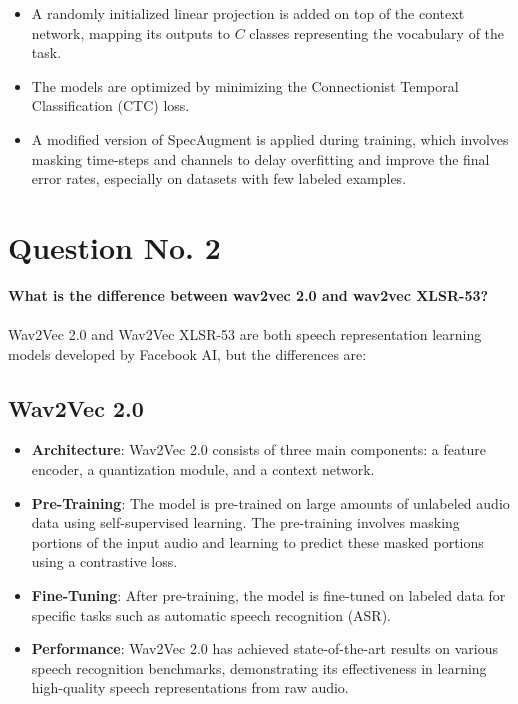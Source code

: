 \documentclass{article}
\begin{document}
\begin{itemize}
  \item A randomly initialized linear projection is added on top of the context network, mapping its outputs to \( C \) classes representing the vocabulary of the task.
  \item The models are optimized by minimizing the Connectionist Temporal Classification (CTC) loss.
  \item A modified version of SpecAugment is applied during training, which involves masking time-steps and channels to delay overfitting and improve the final error rates, especially on datasets with few labeled examples.
\end{itemize}

\pagebreak

\section{Question No. 2}
\textbf{What is the difference between wav2vec 2.0 and wav2vec XLSR-53?}\\\\
Wav2Vec 2.0 and Wav2Vec XLSR-53 are both speech representation learning models developed by Facebook AI, but the differences are:

\subsection{Wav2Vec 2.0}
\begin{itemize}
  \item \textbf{Architecture}: Wav2Vec 2.0 consists of three main components: a feature encoder, a quantization module, and a context network.
  \item \textbf{Pre-Training}: The model is pre-trained on large amounts of unlabeled audio data using self-supervised learning. The pre-training involves masking portions of the input audio and learning to predict these masked portions using a contrastive loss.
  \item \textbf{Fine-Tuning}: After pre-training, the model is fine-tuned on labeled data for specific tasks such as automatic speech recognition (ASR).
  \item \textbf{Performance}: Wav2Vec 2.0 has achieved state-of-the-art results on various speech recognition benchmarks, demonstrating its effectiveness in learning high-quality speech representations from raw audio.
\end{itemize}
\end{document}

